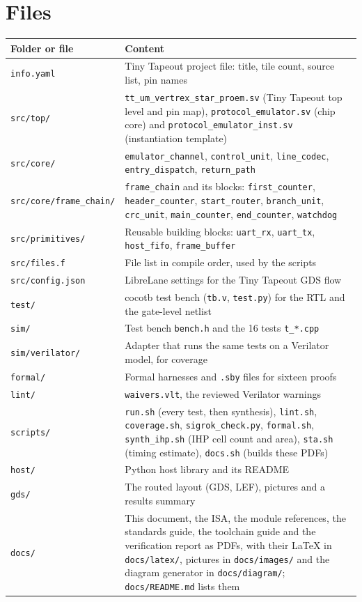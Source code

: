 \documentclass[11pt,a4paper]{article}
\newcommand{\sig}[1]{\texttt{#1}}
\begin{document}
\section{Files}

\begin{center}
\begin{tabularx}{\linewidth}{@{}l>{\raggedright\arraybackslash}X@{}}
\toprule
Folder or file & Content \\
\midrule
\sig{info.yaml} & Tiny Tapeout project file: title, tile count, source list, pin names \\
\sig{src/top/} & \sig{tt\_um\_vertrex\_star\_proem.sv} (Tiny Tapeout top level and pin map), \sig{protocol\_emulator.sv} (chip core) and \sig{protocol\_emulator\_inst.sv} (instantiation template) \\
\sig{src/core/} & \sig{emulator\_channel}, \sig{control\_unit}, \sig{line\_codec}, \sig{entry\_dispatch}, \sig{return\_path} \\
\sig{src/core/frame\_chain/} & \sig{frame\_chain} and its blocks: \sig{first\_counter}, \sig{header\_counter}, \sig{start\_router}, \sig{branch\_unit}, \sig{crc\_unit}, \sig{main\_counter}, \sig{end\_counter}, \sig{watchdog} \\
\sig{src/primitives/} & Reusable building blocks: \sig{uart\_rx}, \sig{uart\_tx}, \sig{host\_fifo}, \sig{frame\_buffer} \\
\sig{src/files.f} & File list in compile order, used by the scripts \\
\sig{src/config.json} & LibreLane settings for the Tiny Tapeout GDS flow \\
\sig{test/} & cocotb test bench (\sig{tb.v}, \sig{test.py}) for the RTL and the gate-level netlist \\
\sig{sim/} & Test bench \sig{bench.h} and the 16 tests \sig{t\_*.cpp} \\
\sig{sim/verilator/} & Adapter that runs the same tests on a Verilator model, for coverage \\
\sig{formal/} & Formal harnesses and \sig{.sby} files for sixteen proofs \\
\sig{lint/} & \sig{waivers.vlt}, the reviewed Verilator warnings \\
\sig{scripts/} & \sig{run.sh} (every test, then synthesis), \sig{lint.sh}, \sig{coverage.sh}, \sig{sigrok\_check.py}, \sig{formal.sh}, \sig{synth\_ihp.sh} (IHP cell count and area), \sig{sta.sh} (timing estimate), \sig{docs.sh} (builds these PDFs) \\
\sig{host/} & Python host library and its README \\
\sig{gds/} & The routed layout (GDS, LEF), pictures and a results summary \\
\sig{docs/} & This document, the ISA, the module references, the standards guide, the toolchain guide and the verification report as PDFs, with their LaTeX in \sig{docs/latex/}, pictures in \sig{docs/images/} and the diagram generator in \sig{docs/diagram/}; \sig{docs/README.md} lists them \\
\bottomrule
\end{tabularx}
\end{center}
\end{document}

